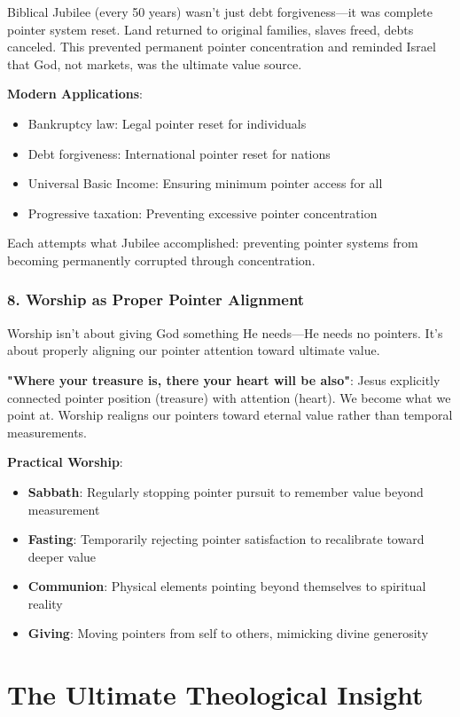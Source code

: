 \documentclass[11pt,oneside]{book}
\begin{document}
{{{{{{Biblical Jubilee (every 50 years) wasn't just debt forgiveness—it was complete pointer system reset. Land returned to original families, slaves freed, debts canceled. This prevented permanent pointer concentration and reminded Israel that God, not markets, was the ultimate value source.

\textbf{Modern Applications}:
\begin{itemize}
\item Bankruptcy law: Legal pointer reset for individuals
\item Debt forgiveness: International pointer reset for nations
\item Universal Basic Income: Ensuring minimum pointer access for all
\item Progressive taxation: Preventing excessive pointer concentration
\end{itemize}

Each attempts what Jubilee accomplished: preventing pointer systems from becoming permanently corrupted through concentration.

\subsubsection{8. Worship as Proper Pointer Alignment}

Worship isn't about giving God something He needs—He needs no pointers. It's about properly aligning our pointer attention toward ultimate value.

\textbf{"Where your treasure is, there your heart will be also"}: Jesus explicitly connected pointer position (treasure) with attention (heart). We become what we point at. Worship realigns our pointers toward eternal value rather than temporal measurements.

\textbf{Practical Worship}:
\begin{itemize}
\item \textbf{Sabbath}: Regularly stopping pointer pursuit to remember value beyond measurement
\item \textbf{Fasting}: Temporarily rejecting pointer satisfaction to recalibrate toward deeper value
\item \textbf{Communion}: Physical elements pointing beyond themselves to spiritual reality
\item \textbf{Giving}: Moving pointers from self to others, mimicking divine generosity
\end{itemize}

\section{The Ultimate Theological Insight}

}}}}}}
\end{document}
